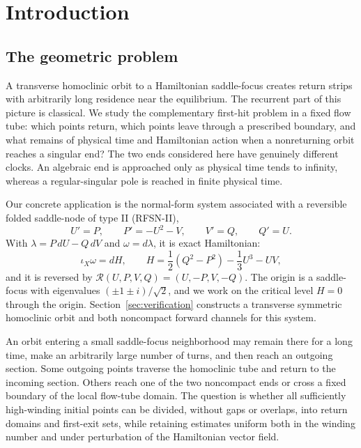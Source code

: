 \documentclass[11pt]{amsart}
\numberwithin{equation}{section}
\theoremstyle{definition}
\theoremstyle{remark}
\newcommand{\cR}{\mathcal R}
\begin{document}
\section{Introduction}

\subsection{The geometric problem}

A transverse homoclinic orbit to a Hamiltonian saddle-focus creates
return strips with arbitrarily long residence near the equilibrium.  The
recurrent part of this picture is classical.  We study the complementary
first-hit problem in a fixed flow tube: which points return, which points
leave through a prescribed boundary, and what remains of physical time
and Hamiltonian action when a nonreturning orbit reaches a singular end?
The two ends considered here have genuinely different clocks.  An
algebraic end is approached only as physical time tends to infinity,
whereas a regular-singular pole is reached in finite physical time.

Our concrete application is the normal-form system associated with a
reversible folded saddle-node of type II (RFSN-II),
\begin{equation}\label{eq:core-intro}
 U'=P,\qquad P'=-U^2-V,\qquad V'=Q,\qquad Q'=U.
\end{equation}
With $\lambda=P\,dU-Q\,dV$ and $\omega=d\lambda$, it is exact Hamiltonian:
\[
 \iota_X\omega=dH,\qquad
 H=\frac12(Q^2-P^2)-\frac13U^3-UV,
\]
and it is reversed by
$\cR(U,P,V,Q)=(U,-P,V,-Q)$.  The origin is a saddle-focus with eigenvalues
$(\pm1\pm i)/\sqrt2$, and we work on the critical level $H=0$ through the
origin.  Section~\ref{sec:verification} constructs a transverse symmetric
homoclinic orbit and both noncompact forward channels for this system.

An orbit entering a small saddle-focus neighborhood may remain there for
a long time, make an arbitrarily large number of turns, and then reach an
outgoing section.  Some outgoing points traverse the homoclinic tube and
return to the incoming section.  Others reach one of the two noncompact
ends or cross a fixed boundary of the local flow-tube domain.  The question
is whether all sufficiently high-winding initial points can be divided,
without gaps or overlaps, into return domains and first-exit sets, while
retaining estimates uniform both in the winding number and under
perturbation of the Hamiltonian vector field.
\end{document}

